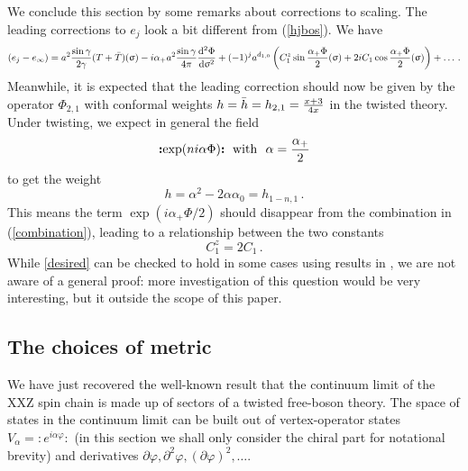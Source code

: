 \documentclass[a4paper,10pt]{article}
\newcommand{\hubert}[1]{$\framebox{\tiny h}$\ \textbf{\texttt{{\color{blue}\footnotesize#1}}}}
\newcommand{\linnea}[1]{$\framebox{\tiny L}$\ \textbf{\texttt{{\color{red}\footnotesize#1}}}}
\newcommand{\normord}[1]{\boldsymbol{:}\mathrel{#1}\boldsymbol{:}}
\begin{document}
\medskip


We conclude this section by some remarks about corrections to scaling. 
The  leading corrections to $e_j$ look a bit different from (\ref{hjbos}).   We have 
%
\begin{equation} 
(e_j-e_\infty)=a^2{\sin\gamma\over 2\gamma}(T+\bar{T})(\upsigma)-i\alpha_+ a^2{\sin\gamma\over 4\pi}{{\rm d}^2\Phi\over {\rm d} \upsigma^2}+(-1)^j a^{d_{1,0}}\left(C_1^z\sin{\alpha_+\Phi\over 2}(\upsigma)+2iC_1\cos{\alpha_+\Phi\over 2}(\upsigma)\right)+\ldots \,. \label{combination}
\end{equation}
%
Meanwhile, it is expected that the leading correction 
should now be given by the operator $\Phi_{2,1}$ with conformal weights $h=\bar{h}=h_{2,1}={x+3\over 4x}$ in the twisted theory. Under twisting, we expect in general the field
%
\begin{equation}
\normord{\exp(ni\alpha\Phi)} \hbox{ with }~\alpha={\alpha_+\over 2}
\end{equation}
%
to get the weight
%
\begin{equation}
h=\alpha^2-2\alpha\alpha_0=h_{1-n,1} \,.
\end{equation}
%
This means the term $\exp(i\alpha_+\Phi/2)$ should disappear from the combination in (\ref{combination}), leading to a relationship between the two constants 
%
\begin{equation}
C_1^z=2C_1 \,. \label{desired}
\end{equation}
%
While \eqref{desired} can be checked to hold in some cases using results in  \cite{Sergei99,Furusaki}, we are not aware of a general proof: more investigation of this question  would be very interesting, but it outside the scope of this paper.


\subsection{The choices of metric}

We have just recovered the well-known result that  the continuum limit of the XXZ spin chain  is made up of sectors of a twisted free-boson theory. The space of states in the continuum limit can be built out of vertex-operator states $V_\alpha = \normord{ e^{i\alpha\varphi} }$ (in this section we shall only consider the chiral part for notational brevity) and derivatives $\partial\varphi, \partial^2\varphi,(\partial\varphi)^2,\ldots$. %
%
\end{document}
